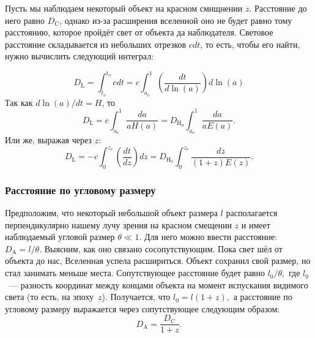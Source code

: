 Пусть мы наблюдаем некоторый объект на красном смнщнении $z$. Расстояние до него равно $D_{\text{C}}$, однако из-за расширения вселенной оно не будет равно тому расстоянию, которое пройдёт свет от объекта да наблюдателя. Световое расстояние складывается из небольших отрезков $c dt$, то есть, чтобы его найти, нужно вычислить следующий интеграл:

$$
D_\text{L} = \int_{t_\text{e}}^{t_\text{o}} c dt = c \int_{a_\text{e}}^{1} \left(\frac{dt}{d \ln(a)}\right)  d \ln(a)
$$
Так как $d \ln (a) \slash dt = H$, то
\begin{equation}
D_\text{L} = c \int_{a_\text{e}}^{1} \frac{da}{aH(a)} = D_{\text{H}_0} \int_{a_\text{e}}^{1} \frac{da}{a E(a)}.
\end{equation}
Или же, выражая через $z$:
\begin{equation}
D_\text{L} = -c \int_{0}^{z_\text{e}} \left(\frac{dt}{dz}\right) dz = D_{\text{H}_0} \int_{0}^{z_\text{e}} \frac{dz}{(1+z)E(z)}.
\end{equation} 

\subsubsection{Расстояние по угловому размеру}

Предположим, что некоторый небольшой объект размера $l$ располагается перпендикулярно нашему лучу зрения на красном смещении $z$ и имеет наблюдаемый угловой размер $\theta \ll 1.$  
Для него можно ввести расстояние: $D_{\text{A}} = l \slash \theta.$ Выясним, как оно связано сосопутствующим. Пока свет шёл от объекта до нас, Вселенная успела расшириться. 
Объект сохранил свой размер, но стал занимать меньше места. Сопутствующее расстояние будет равно $l_0 \slash \theta,$ где $l_0$~--- разность координат между концами объекта на момент испускания видимого света 
(то есть, на эпоху~$z$). Получается, что $l_0 = l (1 + z),$ а расстояние по угловому размеру выражается через сопутствующее следующим образом:
\begin{equation}
D_{\text{A}} = \frac{D_{\text{C}}}{1 + z}.
\end{equation}
 
